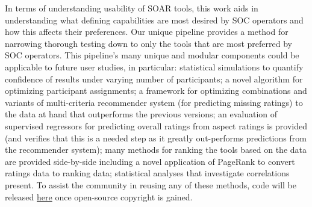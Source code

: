 In terms of understanding usability of SOAR tools, this work aids in understanding what defining capabilities are most desired by SOC operators and how this affects their preferences. 
Our unique pipeline provides a method for narrowing thorough testing down to only the tools that are most preferred by SOC operators. 
This pipeline's many unique and modular components could be applicable to future user studies, in particular: 
statistical simulations to quantify confidence of results under varying number of participants;
a novel algorithm for optimizing participant assignments; 
a framework for optimizing combinations and variants of multi-criteria recommender system (for predicting missing ratings) to the data at hand that outperforms the previous versions; 
an evaluation of supervised regressors for predicting overall ratings from aspect ratings is provided (and verifies that this is a needed step as it greatly out-performs predictions from the recommender system); 
many methods for ranking the tools based on the data are provided side-by-side including a novel application of PageRank to convert ratings data to ranking data; 
statistical analyses that investigate correlations present. 
To assist the community in reusing any of these methods, code will be released \href{https://github.com/noremsa/SurveyAnalysisFramework}{here} once open-source copyright is gained. 

